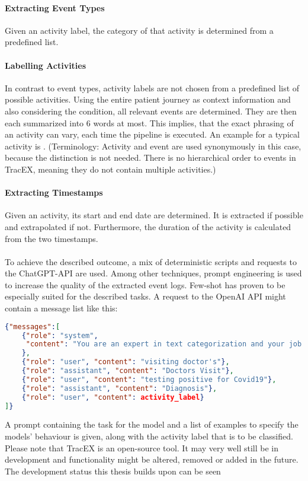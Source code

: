 \paragraph{Extracting Event Types} Given an activity label, the category of that activity is determined from a predefined list.
\paragraph{Labelling Activities} In contrast to event types, activity labels are not chosen from a predefined list of possible activities. Using the entire patient journey as context information and also considering the condition, all relevant events are determined. They are then each summarized into 6 words at most. This implies, that the exact phrasing of an activity can vary, each time the pipeline is executed. An example for a typical activity is .
(Terminology: Activity and event are used synonymously in this case, because the distinction is not needed. There is no hierarchical order to events in TracEX, meaning they do not contain multiple activities.)
\paragraph{Extracting Timestamps} Given an activity, its start and end date are determined. It is extracted if possible and extrapolated if not. Furthermore, the duration of the activity is calculated from the two timestamps.\\\\
To achieve the described outcome, a mix of deterministic scripts and requests to the ChatGPT-API are used. Among other techniques, prompt engineering is used to increase the quality of the extracted event logs.
Few-shot has proven to be especially suited for the described tasks. A request to the OpenAI API might contain a message list like this:
\begin{lstlisting}[language=json, caption={Few-shot prompt to categorize activities into event types}, label={lst:few-shot}]
{"messages":[
	{"role": "system",  
     "content": "You are an expert in text categorization and your job is to take a given activity label and to classify it into one of the following event types: 'Symptom Onset', 'Symptom Offset', 'Diagnosis', 'Doctor Visit', 'Treatment', 'Hospital Admission', 'Hospital Discharge', 'Medication', 'Lifestyle Change' and 'Feelings'. Please consider the capitalization.",  
	},  
    {"role": "user", "content": "visiting doctor's"},  
    {"role": "assistant", "content": "Doctors Visit"},  
    {"role": "user", "content": "testing positive for Covid19"},
    {"role": "assistant", "content": "Diagnosis"},  
    {"role": "user", "content": activity_label}  
]}
\end{lstlisting}
A prompt containing the task for the model and a list of examples to specify the models' behaviour is given, along with the activity label that is to be classified.
Please note that TracEX is an open-source tool. It may very well still be in development and functionality might be altered, removed or added in the future. The development status this thesis builds upon can be seen 
